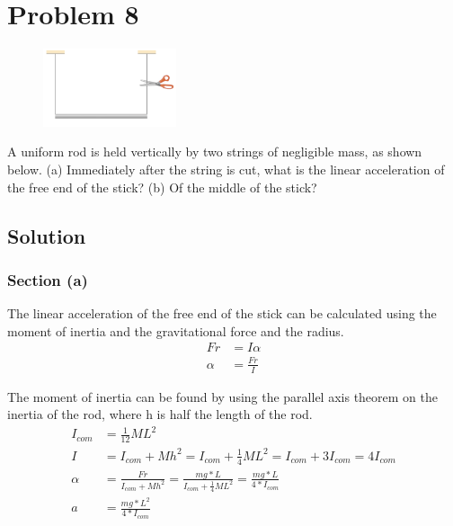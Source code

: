 \documentclass[12pt]{article}
\begin{document}
\pagebreak
\section{Problem 8}
\begin{figure}
    \vspace{-30pt}
    \includegraphics[width=0.35\textwidth]{graph_8.png} 
\end{figure}
A uniform rod is held vertically by two strings of negligible mass, as shown below. (a) Immediately after the string is cut, what is the linear acceleration of the free end of the stick? (b) Of the middle of the stick?

\subsection{Solution}
\subsubsection{Section (a)}
The linear acceleration of the free end of the stick can be calculated using the moment of inertia and the gravitational force and the radius.
\begin{align}
    Fr  &=  I\alpha\\
    \alpha  &=  \frac{Fr}{I}
\end{align}

The moment of inertia can be found by using the parallel axis theorem on the inertia of the rod, where h is half the length of the rod.
\begin{align}
    I_{com} &=  \frac{1}{12}ML^2\\
    I   &=  I_{com} + Mh^2
        =   I_{com} + \frac{1}{4}ML^2
        =   I_{com} + 3I_{com}
        =   4I_{com}\\
    \alpha  &=  \frac{Fr}{I_{com} + Mh^2}
        =   \frac{mg*L}{I_{com} + \frac{1}{4}ML^2}
        =   \frac{mg*L}{4*I_{com}}\\
    a   &=  \frac{mg*L^2}{4*I_{com}}
\end{align}
\end{document}
